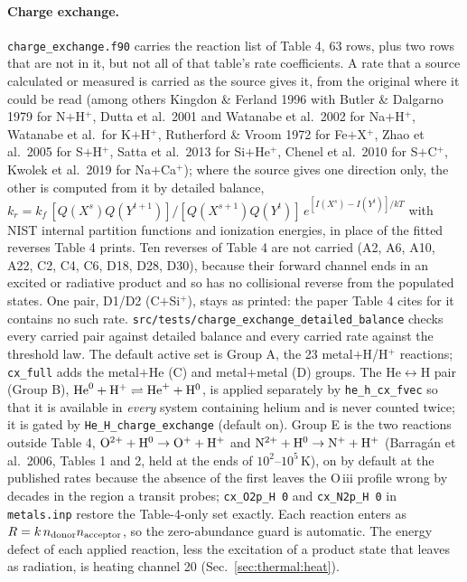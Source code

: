 \paragraph{Charge exchange.} \texttt{charge\_exchange.f90} carries the
reaction list of \citet{Huang2023} Table 4, 63 rows, plus two rows that
are not in it, but not all of that table's rate coefficients. A rate that a
source calculated or measured is carried as the source gives it, from the
original where it could be read (among others Kingdon \& Ferland 1996 with
Butler \& Dalgarno 1979 for N$+$H$^+$, Dutta et al.\ 2001 and Watanabe et al.\
2002 for Na$+$H$^+$, Watanabe et al.\ for K$+$H$^+$, Rutherford \& Vroom 1972 for Fe$+$X$^+$, Zhao et
al.\ 2005 for S$+$H$^+$, Satta et al.\ 2013 for Si$+$He$^+$, Chenel et al.\
2010 for S$+$C$^+$, Kwolek et al.\ 2019 for Na$+$Ca$^+$); where the source
gives one direction only, the other is computed from it by detailed balance,
$k_r = k_f\,[Q(X^s)Q(Y^{t+1})]/[Q(X^{s+1})Q(Y^t)]\,
e^{[I(X^s)-I(Y^t)]/kT}$ with NIST internal partition functions and
ionization energies, in place of the fitted reverses Table 4 prints. Ten
reverses of Table 4 are not carried (A2, A6, A10, A22, C2, C4, C6, D18,
D28, D30), because their forward channel ends in an excited or radiative
product and so has no collisional reverse from the populated states. One
pair, D1/D2 (C$+$Si$^+$), stays as printed: the paper Table 4 cites for it
contains no such rate. \texttt{src/tests/charge\_exchange\_detailed\_balance}
checks every carried pair against detailed balance and every carried rate
against the threshold law. The default active set is Group A, the 23
metal$+$H/H$^+$ reactions; \texttt{cx\_full} adds the metal$+$He (C) and
metal$+$metal (D) groups. The He$\leftrightarrow$H pair (Group B),
${\rm He}^0+{\rm H}^+ \rightleftharpoons {\rm He}^+ + {\rm H}^0$, is applied
separately by \texttt{he\_h\_cx\_fvec} so that it is available in
\emph{every} system containing helium and is never counted twice; it is
gated by \texttt{He\_H\_charge\_exchange} (default on). Group E is the two
reactions outside Table 4, ${\rm O}^{2+}+{\rm H}^0\to{\rm O}^{+}+{\rm H}^+$
and ${\rm N}^{2+}+{\rm H}^0\to{\rm N}^{+}+{\rm H}^+$ (Barrag\'an et al.\
2006, Tables 1 and 2, held at the ends of $10^2$--$10^5$\,K), on by default
at the published rates because the absence of the first leaves the
O\,{\sc iii} profile wrong by decades in the region a transit probes;
\texttt{cx\_O2p\_H 0} and \texttt{cx\_N2p\_H 0} in \texttt{metals.inp}
restore the Table-4-only set exactly. Each reaction enters as $R = k\,n_{\rm donor}n_{\rm acceptor}$, so
the zero-abundance guard is automatic. The energy defect of each applied
reaction, less the excitation of a product state that leaves as radiation,
is heating channel 20 (Sec.~\ref{sec:thermal:heat}).


